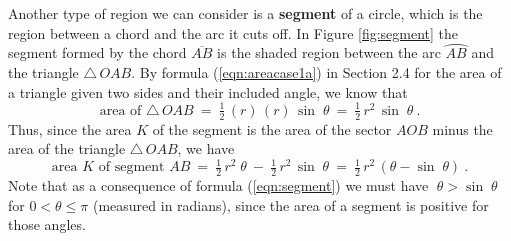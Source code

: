 \piccaption[]{\label{fig:segment}}
Another type of region we can consider is a \textbf{segment} of
a circle, which is the region between a chord and the arc it cuts off. In Figure \ref{fig:segment}
the segment formed by the chord $\overline{AB}$ is the shaded region between the arc
$\wideparen{AB}$ and the triangle $\triangle\,OAB$. By formula (\ref{eqn:areacase1a}) in Section
2.4 for the area of a triangle given two sides and their included angle, we know that
\begin{displaymath}
 \text{area of } \triangle\,OAB ~=~ \tfrac{1}{2}\,(r)\,(r)\,\sin\;\theta ~=~
  \tfrac{1}{2}\,r^2 \,\sin\;\theta ~.
\end{displaymath}
Thus, since the area $K$ of the segment is the area of the sector $AOB$ minus the area of the
triangle $\triangle\,OAB$, we have
\begin{equation}
 \text{area $K$ of segment } AB ~=~ \tfrac{1}{2}\,r^2 \;\theta ~-~ \tfrac{1}{2}\,r^2 \,\sin\;\theta
  ~=~ \boxed{\tfrac{1}{2}\,r^2 \,(\theta - \sin\;\theta)} ~.\label{eqn:segment}
\end{equation}
Note that as a consequence of formula (\ref{eqn:segment}) we must have $\;\theta > \sin\;\theta$
for $0 < \theta \le \pi$ (measured in radians), since the area of a segment is positive for those
angles.

